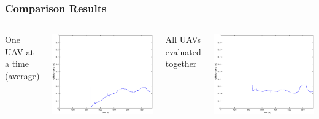 \documentclass{beamer}
\begin{document}
\begin{frame}
\frametitle{Comparison Results}
\begin{columns}[c]
\begin{center}
One UAV at a time (average)
\end{center}
\includegraphics[width=\textwidth]{100-onefulls.eps}
\begin{center}
All UAVs evaluated together
\end{center}
\includegraphics[width=\textwidth]{100-multifulls.eps}
\end{columns}
\end{frame}
\end{document}
